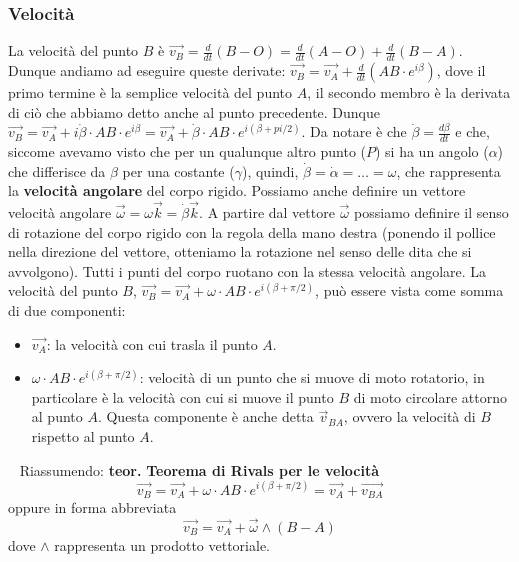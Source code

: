 \subsubsection{Velocità}
La velocità del punto $B$ è $\vec{v_B} = \frac{d}{dt}(B-O) = \frac{d}{dt}(A-O) + \frac{d}{dt}(B-A)$. Dunque andiamo ad eseguire queste derivate: $\vec{v_B} = \vec{v_A} + \frac{d}{dt} (AB \cdot e^{i \beta})$, dove il primo termine è la semplice velocità del punto $A$, il secondo membro è la derivata di ciò che abbiamo detto anche al punto precedente. Dunque $\vec{v_B} = \vec{v_A} + i \dot{\beta} \cdot AB \cdot e^{i \beta} = \vec{v_A} + \dot{\beta} \cdot AB \cdot e^{i(\beta + pi/2)}$. Da notare è che $\dot{\beta} = \frac{d \beta}{d t}$ e che, siccome avevamo visto che per un qualunque altro punto ($P$) si ha un angolo ($\alpha$) che differisce da $\beta$ per una costante ($\gamma$), quindi, $\dot{\beta} = \dot{\alpha} = \dots = \omega$, che rappresenta la \textbf{velocità angolare} del corpo rigido. Possiamo anche definire un vettore velocità angolare $\vec{\omega} = \omega \vec{k} = \dot{\beta} \vec{k}$.\newline
\newline
A partire dal vettore $\vec{\omega}$ possiamo definire il senso di rotazione del corpo rigido con la regola della mano destra (ponendo il pollice nella direzione del vettore, otteniamo la rotazione nel senso delle dita che si avvolgono).\newline
\newline
Tutti i punti del corpo ruotano con la stessa velocità angolare.\newline
La velocità del punto $B$, $\vec{v_B} = \vec{v_A} + \omega \cdot AB \cdot e^{i(\beta + \pi/2)}$, può essere vista come somma di due componenti:
\begin{itemize}
    \item $\vec{v_A}$: la velocità con cui trasla il punto $A$.
    \item $\omega \cdot AB \cdot e^{i(\beta + \pi/2)}$: velocità di un punto che si muove di moto rotatorio, in particolare è la velocità con cui si muove il punto $B$ di moto circolare attorno al punto $A$. Questa componente è anche detta $\vec{v}_{BA}$, ovvero la velocità di $B$ rispetto al punto $A$.
\end{itemize}
\ \newline
Riassumendo: \newline
\textbf{teor.} \textbf{Teorema di Rivals per le velocità}
\[
    \vec{v_B} = \vec{v_A} + \omega \cdot AB \cdot e^{i(\beta + \pi/2)} = \vec{v_A} + \vec{v_{BA}}
\]
oppure in forma abbreviata
\[
    \vec{v_B} = \vec{v_A} + \vec{\omega}\land(B-A)
\]
dove $\land$ rappresenta un prodotto vettoriale.
